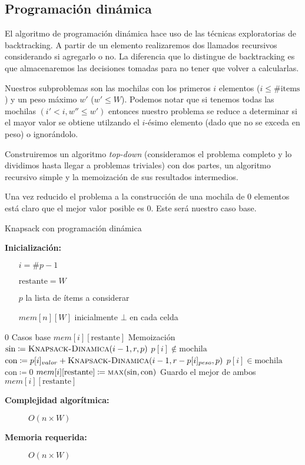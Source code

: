 \documentclass[fleqn, 11pt]{article}
\def\is{\coloneqq}
\begin{document}
\subsection{Programación dinámica}

El algoritmo de programación dinámica hace uso de las técnicas exploratorias de
backtracking. A partir de un elemento realizaremos dos llamados recursivos
considerando si agregarlo o no. La diferencia que lo distingue de backtracking
es que almacenaremos las decisiones tomadas para no tener que volver a
calcularlas.

Nuestros subproblemas son las mochilas con los primeros $i$ elementos ($i \le
\#\text{items}$) y un peso máximo $w'$ ($w' \le W$). Podemos notar que si
tenemos todas las mochilas $(i' < i, w'' \le w')$ entonces nuestro problema se
reduce a determinar si el mayor valor se obtiene utilzando el $i$-ésimo
elemento (dado que no se exceda en peso) o ignorándolo.

Construiremos un algoritmo \emph{top-down} (consideramos el problema completo y
lo dividimos hasta llegar a problemas triviales) con dos partes, un algoritmo
recursivo simple y la memoización de sus resultados intermedios.

Una vez reducido el problema a la construcción de una mochila de $0$ elementos
está claro que el mejor valor posible es $0$. Este será nuestro caso base.

\newpage

\begin{algorithm}
\caption{Knapsack con programación dinámica}
\begin{algorithmic}[1]
\item[\textbf{Inicialización:}]
\item[] \begin{itemize}
	\item[] $i = \#p - 1$
	\item[] $\text{restante} = W$
	\item[] $p$ la lista de ítems a considerar
	\item[] $mem[n][W]$ inicialmente $\bot$ en cada celda
\end{itemize}
\Statex
{}
	\State \Return $0$
\Comment Casos base
\EndIf
{}
	\State	\Return $mem[i][\text{restante}]$
	\Comment Memoización
\EndIf
\State $\text{sin} \is \Call{Knapsack-Dinamica}{i - 1, r, p}$
\Comment $p[i] \not \in \text{mochila}$
	\State $\text{con} \is p[i]_{valor} + \Call{Knapsack-Dinamica}{i - 1, r - p[i]_{peso}, p}$
	\Comment $p[i] \in \text{mochila}$
\Else
	\State $\text{con} \is 0$
\EndIf
\State $mem[i][\text{restante}] \is \Call{max}{\text{sin}, \text{con}}$
\Comment Guardo el mejor de ambos
\State \Return $mem[i][\text{restante}]$
\EndFunction
\end{algorithmic}
\begin{description}
	\item[\textbf{Complejidad algorítmica:}] $O(n \times W)$
	\item[\textbf{Memoria requerida:}] $O(n \times W)$
\end{description}
\end{algorithm}
\end{document}
